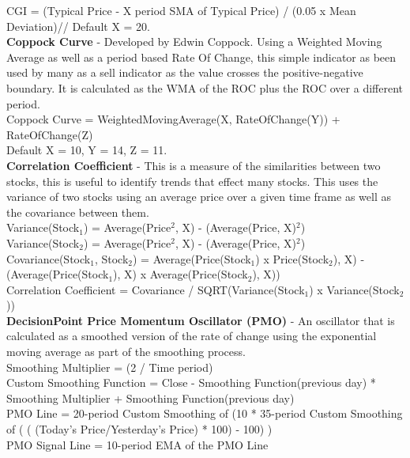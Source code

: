 \documentclass[12pt,a4paper]{article}
\begin{document}
\noindent
CGI = (Typical Price - X period SMA of Typical Price) / (0.05 x Mean Deviation)//
Default X = 20.\\

\iffalse
[]
\fi

\noindent
\textbf{Coppock Curve} - Developed by Edwin Coppock. Using a Weighted Moving Average as well as a period based Rate Of Change, this simple indicator as been used by many as a sell indicator as the value crosses the positive-negative boundary. It is calculated as the WMA of the ROC plus the ROC over a different period.\\

\noindent
Coppock Curve = WeightedMovingAverage(X, RateOfChange(Y)) + RateOfChange(Z)\\
Default X = 10, Y = 14, Z = 11. \\

\iffalse
[]
\fi

\noindent
\textbf{Correlation Coefficient} - This is a measure of the similarities between two stocks, this is useful to identify trends that effect many stocks. This uses the variance of two stocks using an average price over a given time frame as well as the covariance between them.\\

\noindent
Variance(Stock$_1$) = Average(Price$^2$, X) - (Average(Price, X)$^2$)\\
Variance(Stock$_2$) = Average(Price$^2$, X) - (Average(Price, X)$^2$)\\
Covariance(Stock$_1$, Stock$_2$) = Average(Price(Stock$_1$) x Price(Stock$_2$), X) - (Average(Price(Stock$_1$), X) x Average(Price(Stock$_2$), X))\\
Correlation Coefficient = Covariance / SQRT(Variance(Stock$_1$) x Variance(Stock$_2$))\\

\iffalse
[]
\fi

\noindent
\textbf{DecisionPoint Price Momentum Oscillator (PMO)} - An oscillator that is calculated as a smoothed version of the rate of change using the exponential moving average as part of the smoothing process. \\

\noindent
Smoothing Multiplier = (2 / Time period)\\
Custom Smoothing Function = {Close - Smoothing Function(previous day)} * Smoothing Multiplier + Smoothing Function(previous day) \\
PMO Line = 20-period Custom Smoothing of (10 * 35-period Custom Smoothing of ( ( (Today's Price/Yesterday's Price) * 100) - 100) )\\
PMO Signal Line = 10-period EMA of the PMO Line\\
\end{document}
